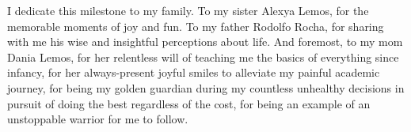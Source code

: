 I dedicate this milestone to my family. To my sister Alexya Lemos, for the memorable moments of joy and fun. To my father Rodolfo Rocha, for sharing with me his wise and insightful perceptions about life. And foremost, to my mom Dania Lemos, for her relentless will of teaching me the basics of everything since infancy, for her always-present joyful smiles to alleviate my painful academic journey, for being my golden guardian during my countless unhealthy decisions in pursuit of doing the best regardless of the cost, for being an example of an unstoppable warrior for me to follow.
